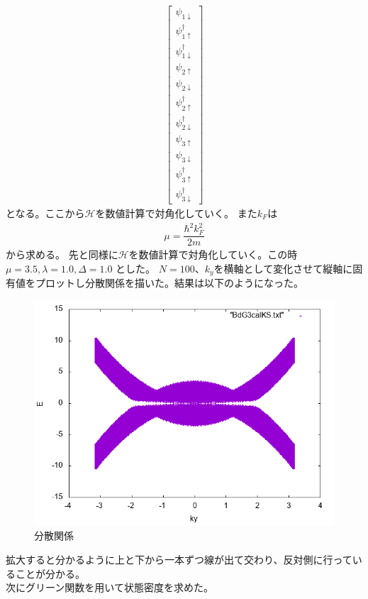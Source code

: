 \documentclass{jarticle}
\begin{document}
\begin{align}
\begin{bmatrix}
\psi_{1\downarrow} \\ 
\psi_{1\uparrow}^\dagger \\ 
\psi_{1\downarrow}^\dagger \\ 
\psi_{2\uparrow} \\ 
\psi_{2\downarrow} \\ 
\psi_{2\uparrow}^\dagger \\ 
\psi_{2\downarrow}^\dagger \\ 
\psi_{3\uparrow} \\ 
\psi_{3\downarrow} \\ 
\psi_{3\uparrow}^\dagger \\ 
\psi_{3\downarrow}^\dagger
\end{bmatrix} 
\end{align}
となる。ここから$\mathcal{H}$を数値計算で対角化していく。
また$k_{F}$は
\begin{align}
\mu=\dfrac{\hbar^{2}k_F^{2}}{2m}
\end{align}
から求める。
先と同様に$\mathcal{H}$を数値計算で対角化していく。この時$\mu=3.5, \lambda=1.0, \Delta=1.0$	とした。
$N=100$、$k_y$を横軸として変化させて縦軸に固有値をプロットし分散関係を描いた。結果は以下のようになった。\\
\begin{figure}[H]
	\centering
	\includegraphics[scale=0.7]{BdG3calKSax.png}
	\caption{分散関係}
		\label{3ek}
\end{figure}
拡大すると分かるように上と下から一本ずつ線が出て交わり、反対側に行っていることが分かる。\\
次にグリーン関数を用いて状態密度を求めた。
\end{document}

